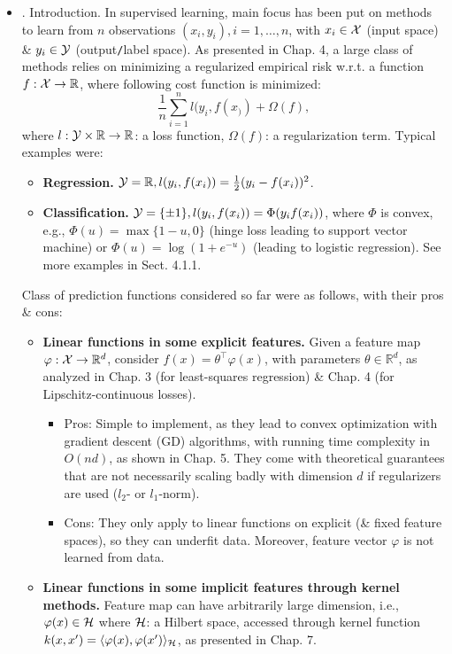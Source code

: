 \documentclass{article}
\begin{document}
\begin{enumerate}
\begin{itemize}
		\begin{itemize}
			\item {. Introduction.} In supervised learning, main focus has been put on methods to learn from $n$ observations $(x_i,y_i),i = 1,\ldots,n$, with $x_i\in{\cal X}$ (input space) \& $y_i\in{\cal Y}$ (output{\tt/}label space). As presented in Chap. 4, a large class of methods relies on minimizing a regularized empirical risk w.r.t. a function $f:{\cal X}\to\mathbb{R}$, where following cost function is minimized:
			\begin{equation}
				\frac{1}{n}\sum_{i=1}^n l(y_i,f(x_)) + \Omega(f),
			\end{equation}
			where $l:{\cal Y}\times\mathbb{R}\to\mathbb{R}$: a loss function, $\Omega(f)$: a regularization term. Typical examples were:
			\begin{itemize}
				\item {\bf Regression.} ${\cal Y} = \mathbb{R},l(y_i,f(x_i)) = \frac{1}{2}(y_i - f(x_i))^2$.
				\item {\bf Classification.} ${\cal Y} = \{\pm1\},l(y_i,f(x_i)) = \Phi(y_if(x_i))$, where $\Phi$ is convex, e.g., $\Phi(u) = \max\{1 - u,0\}$ (hinge loss leading to support vector machine) or $\Phi(u) = \log(1 + e^{-u})$ (leading to logistic regression). See more examples in Sect. 4.1.1.
			\end{itemize}
			Class of prediction functions considered so far were as follows, with their pros \& cons:
			\begin{itemize}
				\item {\bf Linear functions in some explicit features.} Given a feature map $\varphi:{\cal X}\to\mathbb{R}^d$, consider $f(x) = \theta^\top\varphi(x)$, with parameters $\theta\in\mathbb{R}^d$, as analyzed in Chap. 3 (for least-squares regression) \& Chap. 4 (for Lipschitz-continuous losses).
				\begin{itemize}
					\item Pros: Simple to implement, as they lead to convex optimization with gradient descent (GD) algorithms, with running time complexity in $O(nd)$, as shown in Chap. 5. They come with theoretical guarantees that are not necessarily scaling badly with dimension $d$ if regularizers are used ($l_2$- or $l_1$-norm).
					\item Cons: They only apply to linear functions on explicit (\& fixed feature spaces), so they can underfit data. Moreover, feature vector $\varphi$ is not learned from data.
				\end{itemize}
				\item {\bf Linear functions in some implicit features through kernel methods.} Feature map can have arbitrarily large dimension, i.e., $\varphi(x)\in{\cal H}$ where ${\cal H}$: a Hilbert space, accessed through kernel function $k(x,x') = \langle\varphi(x),\varphi(x')\rangle_{{\cal H}}$, as presented in Chap. 7.

\end{itemize}
\end{itemize}
\end{itemize}
\end{enumerate}
\end{document}
